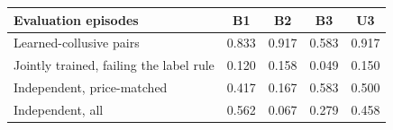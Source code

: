 \begin{tabular}{lcccc}
\toprule
Evaluation episodes & B1 & B2 & B3 & U3 \\
\midrule
Learned-collusive pairs & 0.833 & 0.917 & 0.583 & 0.917 \\
Jointly trained, failing the label rule & 0.120 & 0.158 & 0.049 & 0.150 \\
Independent, price-matched & 0.417 & 0.167 & 0.583 & 0.500 \\
Independent, all & 0.562 & 0.067 & 0.279 & 0.458 \\
\bottomrule
\end{tabular}
